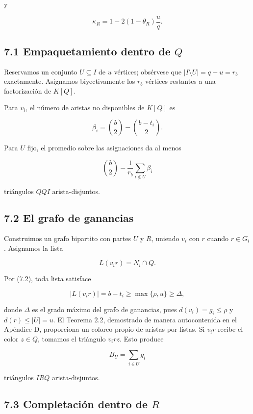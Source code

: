 \documentclass[
  11pt,
]{article}
\begin{document}
y

\[
\kappa_R
=
1-2(1-\theta_R)\frac{u}{q}.
\tag{7.3}
\]

\subsection{\texorpdfstring{7.1 Empaquetamiento dentro de
\(Q\)}{7.1 Empaquetamiento dentro de Q}}\label{empaquetamiento-dentro-de-q}

Reservamos un conjunto \(U\subseteq I\) de \(u\) vértices; obsérvese que
\(|I\setminus U|=q-u=r_b\) exactamente. Asignamos biyectivamente los
\(r_b\) vértices restantes a una factorización de \(K[Q]\).

Para \(v_i\), el número de aristas no disponibles de \(K[Q]\) es

\[
\beta_i
=
\binom b2-\binom{b-t_i}{2}.
\tag{7.4}
\]

Para \(U\) fijo, el promedio sobre las asignaciones da al menos

\[
\binom b2-\frac1{r_b}\sum_{i\notin U}\beta_i
\tag{7.5}
\]

triángulos \(QQI\) arista-disjuntos.

\subsection{7.2 El grafo de ganancias}\label{el-grafo-de-ganancias}

Construimos un grafo bipartito con partes \(U\) y \(R\), uniendo \(v_i\)
con \(r\) cuando \(r\in G_i\). Asignamos la lista

\[
L(v_ir)=N_i\cap Q.
\]

Por (7.2), toda lista satisface

\[
|L(v_ir)|=b-t_i
\ge
\max\{\rho,u\}
\ge
\Delta,
\]

donde \(\Delta\) es el grado máximo del grafo de ganancias, pues
\(d(v_i)=g_i\le\rho\) y \(d(r)\le|U|=u\). El Teorema 2.2, demostrado de
manera autocontenida en el Apéndice D, proporciona un coloreo propio de
aristas por listas. Si \(v_ir\) recibe el color \(z\in Q\), tomamos el
triángulo \(v_irz\). Esto produce

\[
B_U=\sum_{i\in U}g_i
\]

triángulos \(IRQ\) arista-disjuntos.

\subsection{\texorpdfstring{7.3 Completación dentro de
\(R\)}{7.3 Completación dentro de R}}\label{completaciuxf3n-dentro-de-r}
\end{document}
